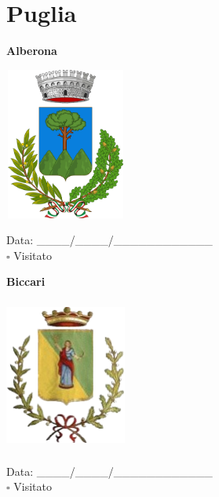 \documentclass[a5paper,12pt]{article}
\begin{document}
\newpage

\section*{Puglia}

\newpage

\noindent
\begin{minipage}[t]{0.45\textwidth}
    \begin{center}
        \textbf{Alberona}
    \end{center}
    \vspace{-0.5cm} %
    \begin{center}
        \includegraphics[height= 5cm, width=4cm]{Puglia/Stemma Alberona.png}
    \end{center}
    \vspace{-0.4cm} %
    \begin{flushleft}
        Data: \_\_\_\_/\_\_\_\_/\_\_\_\_\_\_\_\_\_\_\_\_ \\
        $\square$ Visitato
    \end{flushleft}
\end{minipage}
\hfill
\noindent
\begin{minipage}[t]{0.45\textwidth}
    \begin{center}
        \textbf{Biccari}
    \end{center}
    \vspace{-0.5cm} %
    \begin{center}
        \includegraphics[height= 5cm, width=4cm]{Puglia/Stemma Biccari.png}
    \end{center}
    \vspace{-0.4cm} %
    \begin{flushleft}
        Data: \_\_\_\_/\_\_\_\_/\_\_\_\_\_\_\_\_\_\_\_\_ \\
        $\square$ Visitato
    \end{flushleft}
\end{minipage}
\end{document}
